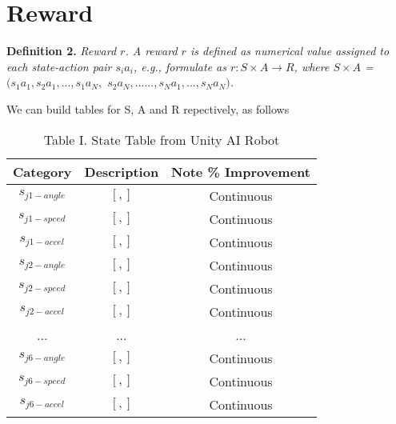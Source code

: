 \documentclass[conference]{IEEEtran}
\begin{document}
\section{Reward}
\textbf{Definition 2.} 
\textit{Reward $r$. 
A reward $r$ is defined as numerical value assigned to each 
state-action pair $s_i a_i$, e.g., formulate as 
$r: S \times A \rightarrow R$, where 
$S \times A $ = $(s_1 a_1, s_2 a_1, ..., s_1 a_N,$ 
$s_2 a_N, ......,s_N a_1,..., s_N a_N)$. 
} 
 
We can build tables for S, A and R repectively, as follows 

\begin{table}[H] 
\renewcommand{\arraystretch}{1.3} 
\caption{Table I. State Table from Unity AI Robot}
\label{state-Table1}
\centering 
\begin{tabular}{|c||c||c|}
\hline
Category     & Description    & Note    \% Improvement \\
\hline
$s_{j1-angle}$     & $[,]$ & Continuous \\
\hline
$s_{j1-speed}$     & $[,]$ & Continuous \\
\hline 
$s_{j1-accel}$     & $[,]$ & Continuous \\
\hline 
$s_{j2-angle}$     & $[,]$ & Continuous \\
\hline
$s_{j2-speed}$     & $[,]$ & Continuous \\
\hline 
$s_{j2-accel}$     & $[,]$ & Continuous \\
\hline 
...     & ... & ... \\
\hline 
$s_{j6-angle}$     & $[,]$ & Continuous \\
\hline
$s_{j6-speed}$     & $[,]$ & Continuous \\
\hline 
$s_{j6-accel}$     & $[,]$ & Continuous \\
\hline 
\end{tabular}
\end{table}
\end{document}

